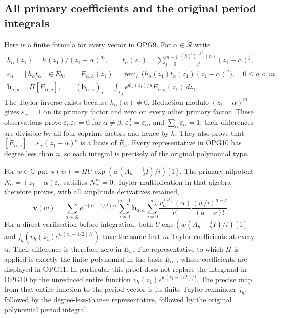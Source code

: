 \subsection{All primary coefficients and the original period integrals}
Here is a finite formula for every vector in OPG9. For
$\alpha\in\mathcal R$ write
\[
\begin{gathered}
 h_\alpha(z_1)=h(z_1)/(z_1-\alpha)^m,\qquad
 t_\alpha(z_1)=\sum_{j=0}^{m-1}
       \frac{(h_\alpha^{-1})^{(j)}(\alpha)}{j!}(z_1-\alpha)^j,\\
 \varepsilon_\alpha=[h_\alpha t_\alpha]\in E_h,
 \qquad E_{\alpha,a}(z_1)=
   \operatorname{rem}_h\bigl(h_\alpha(z_1)t_\alpha(z_1)
                                  (z_1-\alpha)^a\bigr),\quad0\leq a<m,\\
 \mathbf b_{\alpha,a}=\Pi[E_{\alpha,a}],\qquad
 (\mathbf b_{\alpha,a})_j=
   \int_{\Gamma_j}e^{\Phi_h(z_1)/u}E_{\alpha,a}(z_1)\,dz_1.
\end{gathered}\tag{OPG10}
\]
The Taylor inverse exists because $h_\alpha(\alpha)\ne0$.
Reduction modulo $(z_1-\alpha)^m$ gives
$\varepsilon_\alpha=1$ on its primary factor and zero on every
other primary factor. These observations prove
$\varepsilon_\alpha\varepsilon_\beta=0$ for $\alpha\ne\beta$,
$\varepsilon_\alpha^2=\varepsilon_\alpha$, and
$\sum_\alpha\varepsilon_\alpha=1$: their differences are divisible
by all four coprime factors and hence by $h$. They also prove that
$[E_{\alpha,a}]=\varepsilon_\alpha(z_1-\alpha)^a$ is a basis of
$E_h$. Every representative in OPG10 has degree less than $n$,
so each integral is precisely of the original polynomial type.

For $w\in\mathbb C$ put
$\mathbf v(w)=\Pi U\exp(w(A_h-\tfrac12I)/i)[1]$.
The primary nilpotent $N_\alpha=(z_1-\alpha)\varepsilon_\alpha$
satisfies $N_\alpha^m=0$. Taylor multiplication in that algebra
therefore proves, with all amplitude derivatives retained,
\[
\boxed{
 \mathbf v(w)=\sum_{\alpha\in\mathcal R}
 e^{w(\alpha-1/2)/i}\sum_{a=0}^{m-1}\mathbf b_{\alpha,a}
       \sum_{\nu=0}^{a}
       \frac{v_h^{(\nu)}(\alpha)}{\nu!}
       \frac{(w/i)^{a-\nu}}{(a-\nu)!}.
}\tag{OPG11}
\]
For a direct verification before integration, both
$U\exp(w(A_h-\tfrac12I)/i)[1]$ and
$j_h(v_h(z_1)e^{w(z_1-1/2)/i})$ have the same first $m$ Taylor
coefficients at every $\alpha$. Their difference is therefore
zero in $E_h$. The representative to which $\Pi$ is applied is
exactly the finite polynomial in the basis $E_{\alpha,a}$ whose
coefficients are displayed in OPG11. In particular this proof
does not replace the integrand in OPG10 by the unreduced entire
function $v_h(z_1)e^{w(z_1-1/2)/i}$. The precise map from that
entire function to the period vector is its finite Taylor
remainder $j_h$, followed by the degree-less-than-$n$ representative,
followed by the original polynomial period integral.

